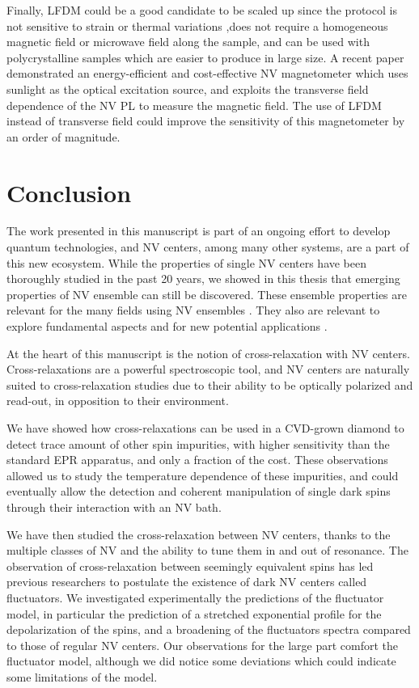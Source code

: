 \documentclass[a4paper, 11pt]{report}
\begin{document}
Finally, LFDM could be a good candidate to be scaled up since the protocol is not sensitive to strain or thermal variations ,does not require a homogeneous magnetic field or microwave field along the sample, and can be used with polycrystalline samples which are easier to produce in large size. A recent paper demonstrated an energy-efficient and cost-effective NV magnetometer which uses sunlight as the optical excitation source, and exploits the transverse field dependence of the NV PL to measure the magnetic field\citep{zhu2022sunlight}. The use of LFDM instead of transverse field could improve the sensitivity of this magnetometer by an order of magnitude.



\chapter*{Conclusion}

The work presented in this manuscript is part of an ongoing effort to develop quantum technologies, and NV centers, among many other systems, are a part of this new ecosystem. While the properties of single NV centers have been thoroughly studied in the past 20 years, we showed in this thesis that emerging properties of NV ensemble can still be discovered. These ensemble properties are relevant for the many fields using NV ensembles \citep{ barry2020sensitivity, eills2022spin, fu2007characterization, perdriat2021spin}. They also are relevant to explore fundamental aspects \citep{choi2017observation, kucsko2018critical, angerer2018superradiant} and for new potential applications \citep{akhmedzhanov2017microwave, pellet2021optical, pellet2022spin}.

At the heart of this manuscript is the notion of cross-relaxation with NV centers. Cross-relaxations are a powerful spectroscopic tool, and NV centers are naturally suited to cross-relaxation studies due to their ability to be optically polarized and read-out, in opposition to their environment.

We have showed how cross-relaxations can be used in a CVD-grown diamond to detect trace amount of other spin impurities, with higher sensitivity than the standard EPR apparatus, and only a fraction of the cost. These observations allowed us to study the temperature dependence of these impurities, and could eventually allow the detection and coherent manipulation of single dark spins through their interaction with an NV bath.

We have then studied the cross-relaxation between NV centers, thanks to the multiple classes of NV and the ability to tune them in and out of resonance. The observation of cross-relaxation between seemingly equivalent spins has led previous researchers to postulate the existence of dark NV centers called fluctuators. We investigated experimentally the predictions of the fluctuator model, in particular the prediction of a stretched exponential profile for the depolarization of the spins, and a broadening of the fluctuators spectra compared to those of regular NV centers. Our observations for the large part comfort the fluctuator model, although we did notice some deviations which could indicate some limitations of the model. 
\end{document}
